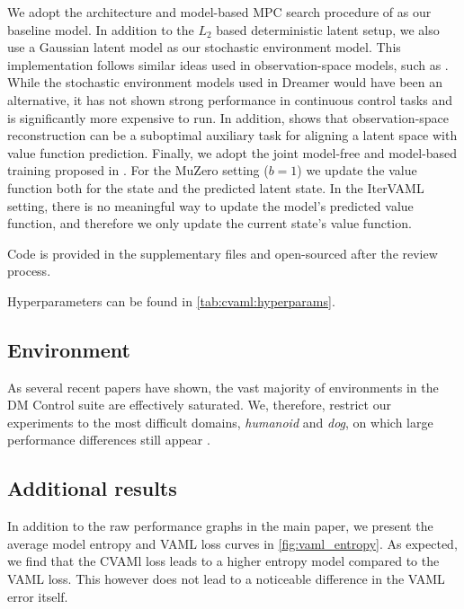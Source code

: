 We adopt the architecture and model-based MPC search procedure of \textcite{hansen2022temporal} as our baseline model.
In addition to the $L_2$ based deterministic latent setup, we also use a Gaussian latent model as our stochastic environment model.
This implementation follows similar ideas used in observation-space models, such as \textcite{pets,janner2019mbpo}.
While the stochastic environment models used in Dreamer \parencite{hafner2021mastering} would have been an alternative, it has not shown strong performance in continuous control tasks and is significantly more expensive to run.
In addition, \textcite{voelcker2024when} shows that observation-space reconstruction can be a suboptimal auxiliary task for aligning a latent space with value function prediction.
Finally, we adopt the joint model-free and model-based training proposed in \textcite{voelcker2025mad}.
For the MuZero setting ($b=1$) we update the value function both for the state and the predicted latent state.
In the IterVAML setting, there is no meaningful way to update the model's predicted value function, and therefore we only update the current state's value function.

Code is provided in the supplementary files and open-sourced after the review process.

Hyperparameters can be found in \autoref{tab:cvaml:hyperparams}.

\subsection{Environment}
\label{app:stoch_env}
As several recent papers have shown, the vast majority of environments in the DM Control suite are effectively saturated. 
We, therefore, restrict our experiments to the most difficult domains, \emph{humanoid} and \emph{dog}, on which large performance differences still appear \parencite{nauman2024bigger,voelcker2025mad,fujimoto2025towards}.


\subsection{Additional results}

In addition to the raw performance graphs in the main paper, we present the average model entropy and VAML loss curves in \autoref{fig:vaml_entropy}.
As expected, we find that the CVAMl loss leads to a higher entropy model compared to the VAML loss.
This however does not lead to a noticeable difference in the VAML error itself.


